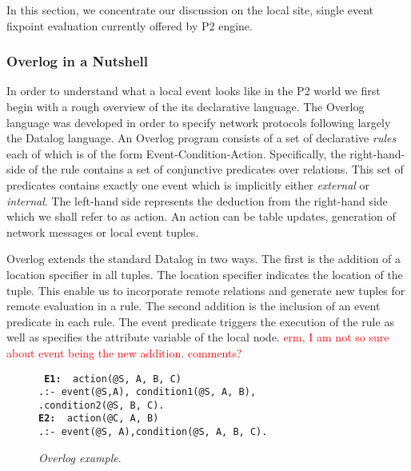 \documentclass{vldb}
\newcommand{\datalogspace}{\textcolor[gray]{1}{.}\hspace{0.5in}}
\begin{document}
In this section, we concentrate our discussion on the local site, single
event fixpoint evaluation currently offered by P2 engine.

\subsubsection{Overlog in a Nutshell}

In order to understand what a local event looks like in the P2 world we first begin
with a rough overview of the its declarative language. 
The Overlog language was developed in order to 
specify network protocols following largely the Datalog language.
An Overlog program consists of a set of declarative {\em rules} 
each of which is of the form Event-Condition-Action. 
Specifically, the right-hand-side of the rule contains
a set of conjunctive predicates over relations.
This set of predicates contains exactly one event which is
implicitly either \emph{external} or \emph{internal}.
The left-hand side represents the deduction from the
right-hand side which we shall refer to as action.
An action can be table updates, generation of 
network messages or local event tuples.

Overlog extends the standard Datalog in two ways. 
The first is the addition of a location specifier in all tuples. 
The location specifier indicates the location of the tuple.
This enable us to incorporate remote relations and generate new
tuples for remote evaluation in a rule.
The second addition is the inclusion of an event predicate in each rule. 
The event predicate triggers the execution of the rule as well as 
specifies the attribute variable of the local node. 
\textcolor{red}{erm, I am not so sure about event being the new addition. comments?}

\begin{figure}[h]
\centering
\begin{boxedminipage}{3.2in}
\small{\tt
{\bf E1: } action(@S, A, B, C) \\
\datalogspace :- event(@S,A), condition1(@S, A, B), \\
\datalogspace condition2(@S, B, C). \\
{\bf E2: } action(@C, A, B)  \\
\datalogspace :- event(@S, A),condition(@S, A, B, C).
}
\small{\caption{\label{fig:datalogeg}\emph{\small Overlog example}.}}
\end{boxedminipage}
\end{figure}
\end{document}
